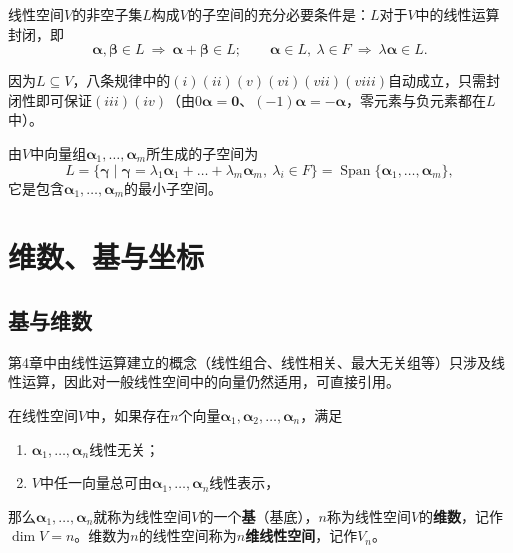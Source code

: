 \begin{theorem}[子空间的判定]
线性空间$V$的非空子集$L$构成$V$的子空间的充分必要条件是：$L$对于$V$中的线性运算封闭，即
\[
\boldsymbol{\alpha},\boldsymbol{\beta}\in L\ \Rightarrow\ \boldsymbol{\alpha}+\boldsymbol{\beta}\in L;
\qquad
\boldsymbol{\alpha}\in L,\ \lambda\in F\ \Rightarrow\ \lambda\boldsymbol{\alpha}\in L .
\]
\end{theorem}

因为$L\subseteq V$，八条规律中的$(i)(ii)(v)(vi)(vii)(viii)$自动成立，只需封闭性即可保证$(iii)(iv)$（由$0\boldsymbol{\alpha}=\boldsymbol{0}$、$(-1)\boldsymbol{\alpha}=-\boldsymbol{\alpha}$，零元素与负元素都在$L$中）。

由$V$中向量组$\boldsymbol{\alpha}_1,\dots,\boldsymbol{\alpha}_m$所生成的子空间为
\[
L=\{\boldsymbol{\gamma}\mid \boldsymbol{\gamma}=\lambda_1\boldsymbol{\alpha}_1+\dots+\lambda_m\boldsymbol{\alpha}_m,\ \lambda_i\in F\}
=\operatorname{Span}\{\boldsymbol{\alpha}_1,\dots,\boldsymbol{\alpha}_m\},
\]
它是包含$\boldsymbol{\alpha}_1,\dots,\boldsymbol{\alpha}_m$的最小子空间。



\section{维数、基与坐标}

\subsection{基与维数}
第4章中由线性运算建立的概念（线性组合、线性相关、最大无关组等）只涉及线性运算，因此对一般线性空间中的向量仍然适用，可直接引用。

\begin{definition}[基、维数]
在线性空间$V$中，如果存在$n$个向量$\boldsymbol{\alpha}_1,\boldsymbol{\alpha}_2,\dots,\boldsymbol{\alpha}_n$，满足
\begin{enumerate}
    \item[(i)] $\boldsymbol{\alpha}_1,\dots,\boldsymbol{\alpha}_n$线性无关；
    \item[(ii)] $V$中任一向量总可由$\boldsymbol{\alpha}_1,\dots,\boldsymbol{\alpha}_n$线性表示，
\end{enumerate}
那么$\boldsymbol{\alpha}_1,\dots,\boldsymbol{\alpha}_n$就称为线性空间$V$的一个\textbf{基}（基底），$n$称为线性空间$V$的\textbf{维数}，记作$\dim V=n$。维数为$n$的线性空间称为\textbf{$n$维线性空间}，记作$V_n$。
\end{definition}

